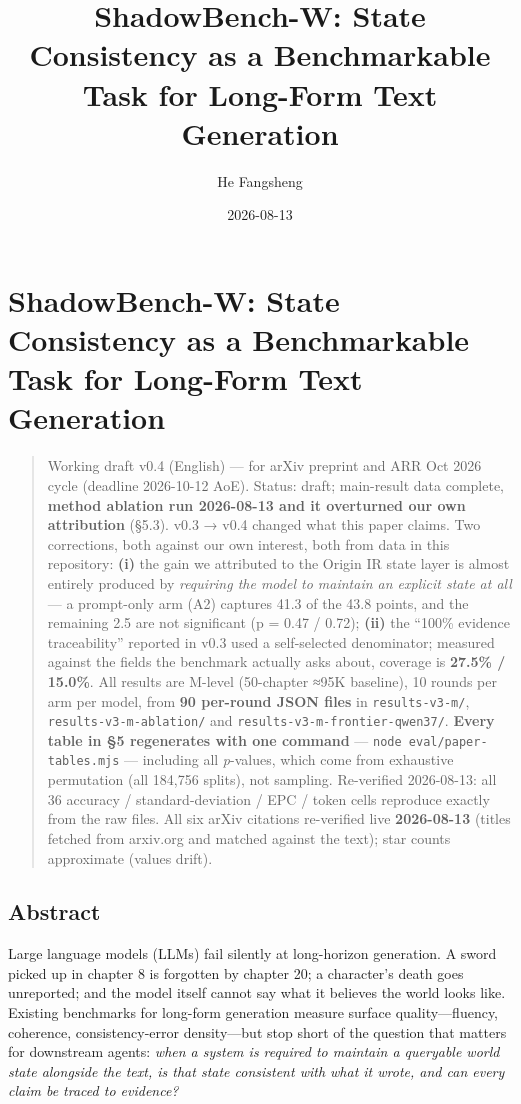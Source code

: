 \documentclass[
  english,
]{article}
\title{ShadowBench-W: State Consistency as a Benchmarkable Task for
Long-Form Text Generation}
\author{He Fangsheng}
\date{2026-08-13}
\begin{document}
\maketitle

\section{ShadowBench-W: State Consistency as a Benchmarkable Task for
Long-Form Text
Generation}\label{shadowbench-w-state-consistency-as-a-benchmarkable-task-for-long-form-text-generation}

\begin{quote}
Working draft v0.4 (English) --- for arXiv preprint and ARR Oct 2026
cycle (deadline 2026-10-12 AoE). Status: draft; main-result data
complete, \textbf{method ablation run 2026-08-13 and it overturned our
own attribution} (§5.3). v0.3 → v0.4 changed what this paper claims. Two
corrections, both against our own interest, both from data in this
repository: \textbf{(i)} the gain we attributed to the Origin IR state
layer is almost entirely produced by \emph{requiring the model to
maintain an explicit state at all} --- a prompt-only arm (A2) captures
41.3 of the 43.8 points, and the remaining 2.5 are not significant (p =
0.47 / 0.72); \textbf{(ii)} the ``100\% evidence traceability'' reported
in v0.3 used a self-selected denominator; measured against the fields
the benchmark actually asks about, coverage is \textbf{27.5\% / 15.0\%}.
All results are M-level (50-chapter ≈95K baseline), 10 rounds per arm
per model, from \textbf{90 per-round JSON files} in
\texttt{results-v3-m/}, \texttt{results-v3-m-ablation/} and
\texttt{results-v3-m-frontier-qwen37/}. \textbf{Every table in §5
regenerates with one command} --- \texttt{node\ eval/paper-tables.mjs}
--- including all \emph{p}-values, which come from exhaustive
permutation (all 184,756 splits), not sampling. Re-verified 2026-08-13:
all 36 accuracy / standard-deviation / EPC / token cells reproduce
exactly from the raw files. All six arXiv citations re-verified live
\textbf{2026-08-13} (titles fetched from arxiv.org and matched against
the text); star counts approximate (values drift).
\end{quote}

\subsection{Abstract}\label{abstract}

Large language models (LLMs) fail silently at long-horizon generation. A
sword picked up in chapter 8 is forgotten by chapter 20; a character's
death goes unreported; and the model itself cannot say what it believes
the world looks like. Existing benchmarks for long-form generation
measure surface quality---fluency, coherence, consistency-error
density---but stop short of the question that matters for downstream
agents: \emph{when a system is required to maintain a queryable world
state alongside the text, is that state consistent with what it wrote,
and can every claim be traced to evidence?}
\end{document}
